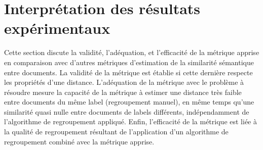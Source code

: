 
\section{Interprétation des résultats expérimentaux}
\label{sec:similarite:experimentations}
Cette section discute la validité, l'adéquation, et l'efficacité de la métrique apprise en comparaison avec d'autres métriques d'estimation de la similarité sémantique entre documents. La validité de la métrique est établie si cette dernière respecte les propriétés d'une distance. L'adéquation de la métrique avec le problème à résoudre mesure la capacité de la métrique à estimer une distance très faible entre documents du même label (regroupement manuel), en même temps qu'une similarité quasi nulle entre documents de labels différents, indépendamment de l'algorithme de regroupement appliqué. Enfin, l'efficacité de la métrique est liée à la qualité de regroupement  résultant de l'application d'un algorithme de regroupement  combiné avec la métrique apprise.


